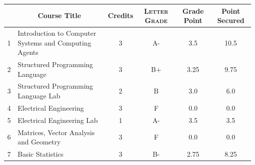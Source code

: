 \documentclass[11pt]{article}
\newcommand*{\numtwo}[1]{\pgfmathprintnumber[
                    fixed, precision=2, fixed zerofill=true]{#1}}
\begin{document}
                \begin{center}
                    \renewcommand{\arraystretch}{1.08}
                    
                \begin{tabular}{|c|l|c|>{\scshape}c|c|c|}
                \hline  \rule[-1ex]{0pt}{3.5ex} {\centering{\bf Course Code}} &  \multicolumn{1}{c|}{\textbf{Course Title}}  & {\bf Credits} & {\bf Letter Grade} & {\bf Grade Point} & {\bf Point Secured}  \\ 
                \hline   1 &  Introduction to Computer Systems and Computing Agents		 & 3 & A- & 3.5 & 10.5 \\ %
                \hline   2 &  Structured Programming Language		 & 3 & B+ & 3.25 & 9.75 \\ %
                \hline   3 &  Structured Programming Language Lab		 & 2 & B & 3.0 & 6.0 \\ %
                \hline   4 &  Electrical Engineering		 & 3 & F & 0.0 & 0.0 \\ %
                \hline   5 &  Electrical Engineering Lab		 & 1 & A- & 3.5 & 3.5 \\ %
                \hline   6 &  Matrices, Vector Analysis and Geometry		 & 3 & F & 0.0 & 0.0 \\ %
                \hline   7 &  Basic Statistics		 & 3 & B- & 2.75 & 8.25 \\ %

\hline                %
                \end{tabular}
                \end{center}
                \renewcommand{\arraystretch}{1.03}
\end{document}
